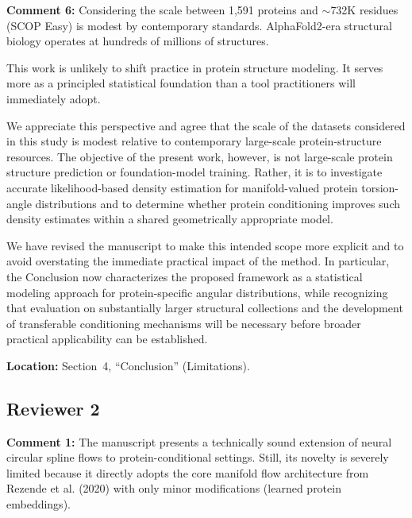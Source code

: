 \documentclass[a4paper,11pt]{article}
\newcommand{\reviewercomment}[2]{%
    \begin{reviewerscomment}
        \textbf{Comment #1:} #2
    \end{reviewerscomment}
}
\newcommand{\response}[1]{%
    \begin{myresponse}
        #1
    \end{myresponse}
    \vspace{5mm}
}
\begin{document}
\reviewercomment{6}{
Considering the scale between 1,591 proteins and $\sim$732K residues
(SCOP Easy) is modest by contemporary standards. AlphaFold2-era structural
biology operates at hundreds of millions of structures.

This work is unlikely to shift practice in protein structure modeling. It
serves more as a principled statistical foundation than a tool practitioners
will immediately adopt.
}

\response{
We appreciate this perspective and agree that the scale of the datasets
considered in this study is modest relative to contemporary large-scale
protein-structure resources. The objective of the present work, however, is
not large-scale protein structure prediction or foundation-model training.
Rather, it is to investigate accurate likelihood-based density estimation for
manifold-valued protein torsion-angle distributions and to determine whether
protein conditioning improves such density estimates within a shared
geometrically appropriate model.

We have revised the manuscript to make this intended scope more explicit and
to avoid overstating the immediate practical impact of the method. In
particular, the Conclusion now characterizes the proposed framework as a
statistical modeling approach for protein-specific angular distributions,
while recognizing that evaluation on substantially larger structural
collections and the development of transferable conditioning mechanisms will
be necessary before broader practical applicability can be established.

\textbf{Location:} Section~4, ``Conclusion'' (Limitations).
}


\subsection*{Reviewer 2}



\reviewercomment{1}{
The manuscript presents a technically sound extension of neural circular
spline flows to protein-conditional settings. Still, its novelty is severely
limited because it directly adopts the core manifold flow architecture from
Rezende et al. (2020) with only minor modifications (learned protein
embeddings).
}
\end{document}
